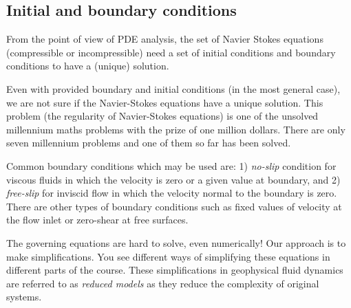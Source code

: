 \documentclass[
  letterpaper,
  twocolumn,
  landscape]{report}
\begin{document}
\hypertarget{initial-and-boundary-conditions}{%
\subsection{Initial and boundary
conditions}\label{initial-and-boundary-conditions}}

From the point of view of PDE analysis, the set of Navier Stokes
equations (compressible or incompressible) need a set of initial
conditions and boundary conditions to have a (unique) solution.

\begin{tcolorbox}[enhanced jigsaw, toprule=.15mm, left=2mm, opacityback=0, breakable, arc=.35mm, colback=white, rightrule=.15mm, bottomrule=.15mm, colframe=quarto-callout-note-color-frame, leftrule=.75mm]
\begin{minipage}[t]{5.5mm}
\textcolor{quarto-callout-note-color}{\faInfo}
\end{minipage}%
\begin{minipage}[t]{\textwidth - 5.5mm}

Even with provided boundary and initial conditions (in the most general
case), we are not sure if the Navier-Stokes equations have a unique
solution. This problem (the regularity of Navier-Stokes equations) is
one of the unsolved millennium maths problems with the prize of one
million dollars. There are only seven millennium problems and one of
them so far has been solved.

\end{minipage}%
\end{tcolorbox}

Common boundary conditions which may be used are: 1) \emph{no-slip}
condition for viscous fluids in which the velocity is zero or a given
value at boundary, and 2) \emph{free-slip} for inviscid flow in which
the velocity normal to the boundary is zero. There are other types of
boundary conditions such as fixed values of velocity at the flow inlet
or zero-shear at free surfaces.

\begin{tcolorbox}[enhanced jigsaw, toprule=.15mm, left=2mm, opacityback=0, breakable, arc=.35mm, colback=white, rightrule=.15mm, bottomrule=.15mm, colframe=quarto-callout-note-color-frame, leftrule=.75mm]
\begin{minipage}[t]{5.5mm}
\textcolor{quarto-callout-note-color}{\faInfo}
\end{minipage}%
\begin{minipage}[t]{\textwidth - 5.5mm}

The governing equations are hard to solve, even numerically! Our
approach is to make simplifications. You see different ways of
simplifying these equations in different parts of the course. These
simplifications in geophysical fluid dynamics are referred to as
\emph{reduced models} as they reduce the complexity of original systems.

\end{minipage}%
\end{tcolorbox}
\end{document}
